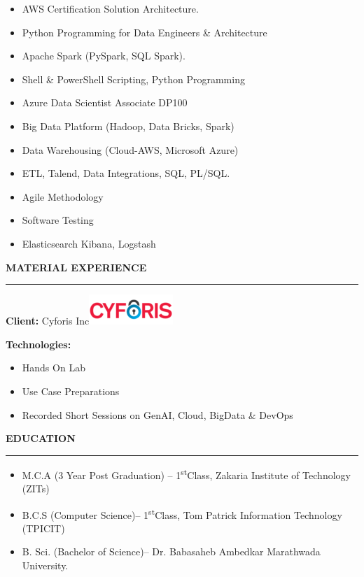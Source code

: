 \documentclass[a4paper]{article}
\begin{document}
\begin{itemize}
\item
  AWS Certification Solution Architecture.
\item
  Python Programming for Data Engineers \& Architecture
\item
  Apache Spark (PySpark, SQL Spark).
\item
  Shell \& PowerShell Scripting, Python Programming
\item
  Azure Data Scientist Associate DP100
\item
  Big Data Platform (Hadoop, Data Bricks, Spark)
\item
  Data Warehousing (Cloud-AWS, Microsoft Azure)
\item
  ETL, Talend, Data Integrations, SQL, PL/SQL.
\item
  Agile Methodology
\item
  Software Testing
\item
  Elasticsearch Kibana, Logstash
\end{itemize}

\begin{center}
  \textbf{MATERIAL EXPERIENCE}
  \rule{\textwidth}{0.4pt}  %
\end{center}

\textbf{Client:} Cyforis
Inc\includegraphics[width=1.25in,height=0.44792in]{media/image22.png}

\textbf{Technologies:}

\begin{itemize}
\item
  Hands On Lab
\item
  Use Case Preparations
\item
  Recorded Short Sessions on GenAI, Cloud, BigData \& DevOps
\end{itemize}

\begin{center}
  \textbf{EDUCATION}
  \rule{\textwidth}{0.4pt}  %
\end{center}

\begin{itemize}
\item
  M.C.A (3 Year Post Graduation) -- 1\textsuperscript{st}Class, Zakaria
  Institute of Technology (ZITs)
\item
  B.C.S (Computer Science)-- 1\textsuperscript{st}Class, Tom Patrick
  Information Technology (TPICIT)
\item
  B. Sci. (Bachelor of Science)-- Dr. Babasaheb Ambedkar Marathwada
  University.
\end{itemize}
\end{document}
